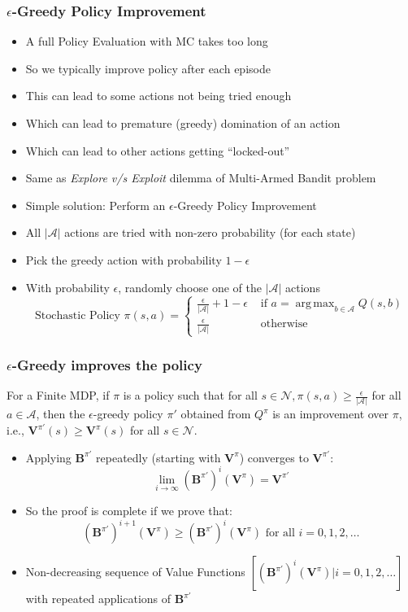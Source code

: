 \documentclass[handout]{beamer}
\DeclareMathOperator*{\argmax}{arg\,max}
\newcommand{\bvpi}{\bm{V}^{\pi}}
\begin{document}
\begin{frame}
\frametitle{$\epsilon$-Greedy Policy Improvement}
\begin{itemize}[<+->]
\item A full Policy Evaluation with MC takes too long
\item So we typically improve policy after each episode
\item This can lead to some actions not being tried enough
\item Which can lead to premature (greedy) domination of an action
\item Which can lead to other actions getting ``locked-out''
\item Same as {\em Explore v/s Exploit} dilemma of Multi-Armed Bandit problem
\item Simple solution: Perform an $\epsilon$-Greedy Policy Improvement
\item All $|\mathcal{A}|$ actions are tried with non-zero probability (for each state)
\item Pick the greedy action with probability $1-\epsilon$
\item With probability $\epsilon$, randomly choose one of the $|\mathcal{A}|$ actions
$$\text{Stochastic Policy } \pi(s,a) = 
\begin{cases}
\frac {\epsilon} {|\mathcal{A}|} + 1 - \epsilon & \text{ if } a = \argmax_{b \in \mathcal{A}} Q(s, b) \\
\frac {\epsilon} {|\mathcal{A}|} & \text{ otherwise}
\end{cases}
$$
\end{itemize}
\end{frame}


\begin{frame}
\frametitle{$\epsilon$-Greedy improves the policy}
\pause
\begin{theorem}
For a Finite MDP, if $\pi$ is a policy such that for all $s \in \mathcal{N}, \pi(s, a) \geq \frac {\epsilon} {|\mathcal{A}|}$ for all $a \in \mathcal{A}$, then the $\epsilon$-greedy policy $\pi'$ obtained from $Q^{\pi}$ is an improvement over $\pi$, i.e., $\bm{V}^{\pi'}(s) \geq \bm{V}^{\pi}(s)$ for all $s \in \mathcal{N}$.
\end{theorem}
\pause
\begin{itemize}[<+->]
\item Applying $\bm{B}^{\pi'}$ repeatedly (starting with $\bvpi$) converges to $\bm{V}^{\pi'}$:
$$\lim_{i\rightarrow \infty} (\bm{B}^{\pi'})^i(\bvpi) = \bm{V}^{\pi'}$$
\item So the proof is complete if we prove that:
$$(\bm{B}^{\pi'})^{i+1}(\bvpi) \geq (\bm{B}^{\pi'})^i(\bvpi) \text{ for all } i = 0, 1, 2, \ldots$$
\item Non-decreasing sequence of Value Functions $[(\bm{B}^{\pi'})^i(\bvpi)|i = 0, 1, 2, \ldots]$ with repeated applications of $\bm{B}^{\pi'}$
\end{itemize}
\end{frame}
\end{document}
